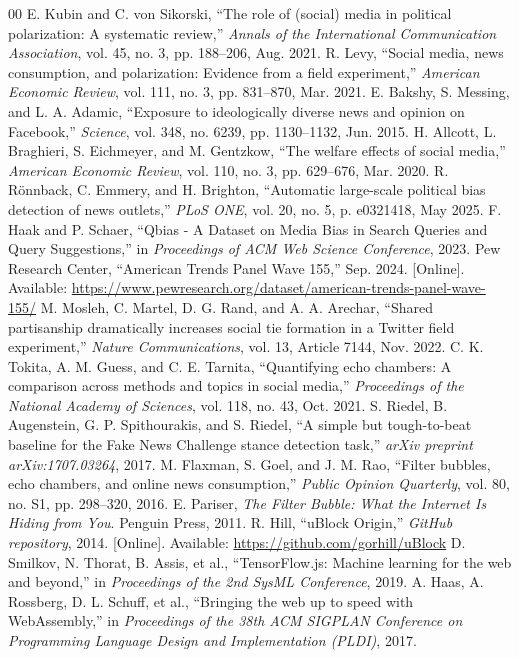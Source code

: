\documentclass[10pt, conference, compsoc]{IEEEtran}
\begin{document}
\begin{thebibliography}{00}
 E. Kubin and C. von Sikorski, ``The role of (social) media in political polarization: A systematic review,'' \textit{Annals of the International Communication Association}, vol. 45, no. 3, pp. 188--206, Aug. 2021.
 R. Levy, ``Social media, news consumption, and polarization: Evidence from a field experiment,'' \textit{American Economic Review}, vol. 111, no. 3, pp. 831--870, Mar. 2021.
 E. Bakshy, S. Messing, and L. A. Adamic, ``Exposure to ideologically diverse news and opinion on Facebook,'' \textit{Science}, vol. 348, no. 6239, pp. 1130--1132, Jun. 2015.
 H. Allcott, L. Braghieri, S. Eichmeyer, and M. Gentzkow, ``The welfare effects of social media,'' \textit{American Economic Review}, vol. 110, no. 3, pp. 629--676, Mar. 2020.
 R. R\"onnback, C. Emmery, and H. Brighton, ``Automatic large-scale political bias detection of news outlets,'' \textit{PLoS ONE}, vol. 20, no. 5, p. e0321418, May 2025.
 F. Haak and P. Schaer, ``Qbias - A Dataset on Media Bias in Search Queries and Query Suggestions,'' in \textit{Proceedings of ACM Web Science Conference}, 2023.
 Pew Research Center, ``American Trends Panel Wave 155,'' Sep. 2024. [Online]. Available: \url{https://www.pewresearch.org/dataset/american-trends-panel-wave-155/}
 M. Mosleh, C. Martel, D. G. Rand, and A. A. Arechar, ``Shared partisanship dramatically increases social tie formation in a Twitter field experiment,'' \textit{Nature Communications}, vol. 13, Article 7144, Nov. 2022.
 C. K. Tokita, A. M. Guess, and C. E. Tarnita, ``Quantifying echo chambers: A comparison across methods and topics in social media,'' \textit{Proceedings of the National Academy of Sciences}, vol. 118, no. 43, Oct. 2021.
 S. Riedel, B. Augenstein, G. P. Spithourakis, and S. Riedel, ``A simple but tough-to-beat baseline for the Fake News Challenge stance detection task,'' \textit{arXiv preprint arXiv:1707.03264}, 2017.
 M. Flaxman, S. Goel, and J. M. Rao, ``Filter bubbles, echo chambers, and online news consumption,'' \textit{Public Opinion Quarterly}, vol. 80, no. S1, pp. 298--320, 2016.
 E. Pariser, \textit{The Filter Bubble: What the Internet Is Hiding from You}. Penguin Press, 2011.
 R. Hill, ``uBlock Origin,'' \textit{GitHub repository}, 2014. [Online]. Available: \url{https://github.com/gorhill/uBlock}
 D. Smilkov, N. Thorat, B. Assis, et al., ``TensorFlow.js: Machine learning for the web and beyond,'' in \textit{Proceedings of the 2nd SysML Conference}, 2019.
 A. Haas, A. Rossberg, D. L. Schuff, et al., ``Bringing the web up to speed with WebAssembly,'' in \textit{Proceedings of the 38th ACM SIGPLAN Conference on Programming Language Design and Implementation (PLDI)}, 2017.
\end{thebibliography}
\end{document}
